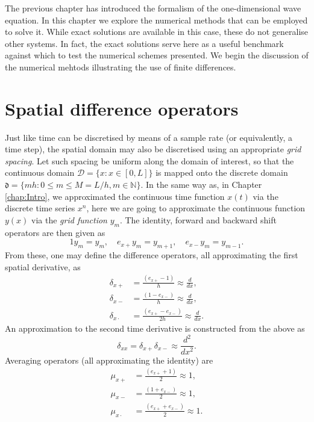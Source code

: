 \documentclass[11pt,twoside,a4paper,english]{book}
\newcommand{\esp}{e_{x+}}
\newcommand{\esm}{e_{x-}}
\newcommand{\dsp}{\delta_{x+}}
\newcommand{\dsm}{\delta_{x-}}
\newcommand{\dsd}{\delta_{x\cdot}}
\newcommand{\dss}{\delta_{xx}}
\begin{document}
The previous chapter has introduced the formalism of the one-dimensional wave equation. In this chapter we explore the numerical methods that can be employed to solve it. While exact solutions are available in this case, these do not generalise other systems. In fact, the exact solutions serve here as a useful benchmark against which to test the numerical schemes presented. We begin the discussion of the numerical mehtods illustrating the use of finite differences. 


\section{Spatial difference operators}


Just like time can be discretised by means of a sample rate (or equivalently, a time step), the spatial domain may also be discretised using an appropriate \emph{grid spacing}. Let such spacing be uniform along the domain of interest, so that the continuous domain $\mathcal{D} = \{ x : x \in [0,L]\}$ is mapped onto the discrete domain $\mathfrak{d} = \{ mh : 0 \leq m \leq M = L/h, m \in {\mathbb N}\}$. In the same way as, in Chapter \ref{chap:Intro}, we approximated the continuous time function $x(t)$ via the discrete time series $x^n$, here we are going to approximate the continuous function $y(x)$ via the \emph{grid function} $y_m$. The identity, forward and backward shift operators are then given as
\begin{equation}
    {1}{y}_m = {y}_m, \quad \esp {y}_m = {y}_{m+1}, \quad \esm {y}_m = {y}_{m-1}.
\end{equation}
From these, one may define the difference operators, all approximating the first spatial derivative, as
\begin{subequations}
    \begin{align}
        \dsp & = \frac{(\esp - 1)}{h} \approx \frac{d}{dx},     \\ 
        \dsm & = \frac{(1 - \esm)}{h}\approx \frac{d}{dx},      \\ 
        \dsd & = \frac{(\esp - \esm)}{2h}\approx \frac{d}{dx} . 
    \end{align}
\end{subequations}
An approximation to the second time derivative is constructed from the above as
\begin{equation}
    \dss  = \dsp\dsm\approx \frac{d^2}{dx^2}.
\end{equation}
Averaging operators (all approximating the identity) are
\begin{subequations}
    \begin{align}
        \mu_{x+} & = \frac{(\esp + 1)}{2} \approx 1,    \\ 
        \mu_{x-} & = \frac{(1 + \esm)}{2} \approx 1,    \\ 
        \mu_{x\cdot}& = \frac{(\esp + \esm)}{2} \approx 1. 
    \end{align}
\end{subequations}
\end{document}
